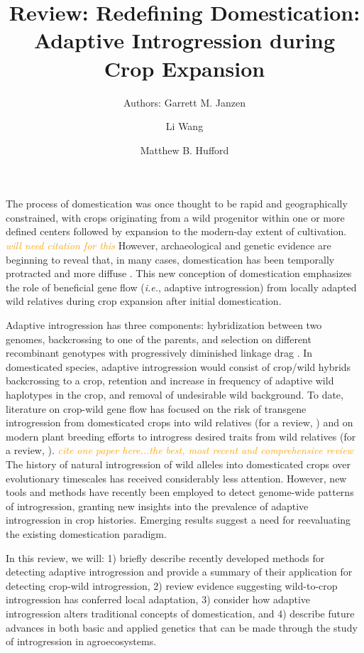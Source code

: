 \documentclass[11pt]{article}
\title{Review: Redefining Domestication: Adaptive Introgression during Crop Expansion}
\author[1]{Authors: Garrett M. Janzen}%
\author[1]{Li Wang}
\author[1,*]{Matthew B. Hufford}
\affil[1]{Department of Ecology, Evolution, and Organismal Biology, Iowa State University, Ames, Iowa, USA}
\affil[*]{Correspondence: mhufford@iastate.edu (M.B. Hufford)}
\date{}
\newcommand{\mbh}[1]{\textcolor{orange}{ \emph{\scriptsize  #1}} } %
\begin{document}
\maketitle



The process of domestication was once thought to be rapid and geographically constrained, with crops originating from a wild progenitor within one or more defined centers followed by expansion to the modern-day extent of cultivation. \mbh{will need citation for this}
However, archaeological and genetic evidence are beginning to reveal that, in many cases, domestication has been temporally protracted and more diffuse \cite{brown2009complex, Meyer2016, wang2017, zhou2017}.
This new conception of domestication emphasizes the role of beneficial gene flow (\emph{i.e.}, adaptive introgression) from locally adapted wild relatives during crop expansion after initial domestication.


Adaptive introgression has three components: hybridization between two genomes, backcrossing to one of the parents, and selection on different recombinant genotypes with progressively diminished linkage drag \cite{barton2001role, Feuillet200824}.
In domesticated species, adaptive introgression would consist of crop/wild hybrids backcrossing to a crop, retention and increase in frequency of adaptive wild haplotypes in the crop, and removal of undesirable wild background.
To date, literature on crop-wild gene flow has focused on the risk of transgene introgression from domesticated crops into wild relatives (for a review, \cite{stewart2003transgene}) and on modern plant breeding efforts to introgress desired traits from wild relatives (for a review, \cite{zamir2001improving, tanksley1997seed, hajjar2007use}). \mbh{cite one paper here...the best, most recent and comprehensive review}
The history of natural introgression of wild alleles into domesticated crops over evolutionary timescales has received considerably less attention.
However, new tools and methods have recently been employed to detect genome-wide patterns of introgression, granting new insights into the prevalence of adaptive introgression in crop histories.
Emerging results suggest a need for reevaluating the existing domestication paradigm.


In this review, we will: 1) briefly describe recently developed methods for detecting adaptive introgression and provide a summary of their application for detecting crop-wild introgression, 2) review evidence suggesting wild-to-crop introgression has conferred local adaptation, 3) consider how adaptive introgression alters traditional concepts of domestication, and 4) describe future advances in both basic and applied genetics that can be made through the study of introgression in agroecosystems.
\end{document}
